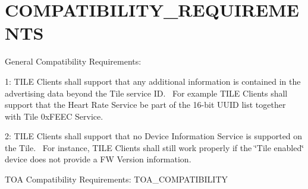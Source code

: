\hypertarget{group___c_o_m_p_a_t_i_b_i_l_i_t_y___r_e_q_u_i_r_e_m_e_n_t_s}{}\section{C\+O\+M\+P\+A\+T\+I\+B\+I\+L\+I\+T\+Y\+\_\+\+R\+E\+Q\+U\+I\+R\+E\+M\+E\+N\+TS}
\label{group___c_o_m_p_a_t_i_b_i_l_i_t_y___r_e_q_u_i_r_e_m_e_n_t_s}
General Compatibility Requirements\+:

1\+: T\+I\+LE Clients shall support that any additional information is contained in the advertising data beyond the Tile service ID.~\newline
 For example T\+I\+LE Clients shall support that the Heart Rate Service be part of the 16-\/bit U\+U\+ID list together with Tile 0x\+F\+E\+EC Service.

2\+: T\+I\+LE Clients shall support that no Device Information Service is supported on the Tile.~\newline
 For instance, T\+I\+LE Clients shall still work properly if the \char`\"{}\+Tile enabled\char`\"{} device does not provide a FW Version information.

T\+OA Compatibility Requirements\+: T\+O\+A\+\_\+\+C\+O\+M\+P\+A\+T\+I\+B\+I\+L\+I\+TY 